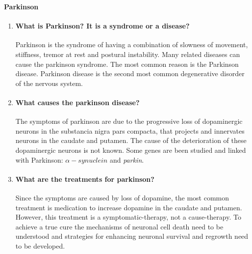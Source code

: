 \documentclass[12pt,article,oneside,a4paper]{memoir}
\begin{document}
\textbf{Parkinson}\\
\begin{enumerate}
\item \paragraph{What is Parkinson? It is a syndrome or a disease?}
Parkinson is the syndrome of having a combination of slowness of movement,
stiffness, tremor at rest and postural instability. Many related diseases can
cause the parkinson syndrome. The most common reason is the Parkinson disease.
Parkinson disease is the second most common degenerative disorder of the
nervous system.

\item \paragraph{What causes the parkinson disease?}
The symptoms of parkinson are due to the progressive loss of dopaminergic
neurons in the substancia nigra pars compacta, that projects and innervates
neurons in the caudate and putamen. The cause of the deterioration of these
dopaminergic neurons is not known. Some genes are been studied and linked with
Parkinson: $\alpha-synuclein$ and \textit{parkin}.

\item \paragraph{What are the treatments for parkinson?}
Since the symptoms are caused by loss of dopamine, the most common treatment is
medication to increase dopamine in the caudate and putamen. However, this
treatment is a symptomatic-therapy, not a cause-therapy.
To achieve a true cure the mechanisms of neuronal cell death need to be
understood and strategies for enhancing neuronal survival and regrowth need to
be developed.

\end{enumerate}
\end{document}
